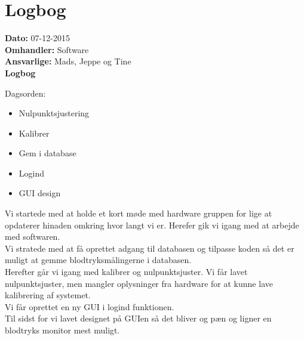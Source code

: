 \section{Logbog}

\textbf{Dato:} 07-12-2015 \\
\textbf{Omhandler:} Software \\
\textbf{Ansvarlige:} Mads, Jeppe og Tine \\
\textbf{Logbog}

Dagsorden:
\begin{itemize}
	\item Nulpunktsjustering
	\item Kalibrer
	\item Gem i database
	\item Logind
	\item GUI design
\end{itemize}

Vi startede med at holde et kort møde med hardware gruppen for lige at opdaterer hinaden omkring hvor langt vi er. Herefer gik vi igang med at arbejde med softwaren.\\
Vi stratede med at få oprettet adgang til databasen og tilpasse koden så det er muligt at gemme blodtryksmålingerne i databasen.\\
Herefter går vi igang med kalibrer og nulpunktsjuster. Vi får lavet nulpunktsjuster, men mangler oplysninger fra hardware for at kunne lave kalibrering af systemet.\\
Vi får oprettet en ny GUI i logind funktionen.\\
Til sidst for vi lavet designet på GUIen så det bliver og pæn og ligner en blodtryks monitor mest muligt. 
